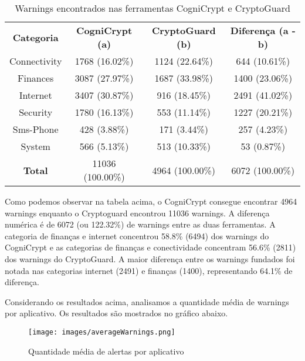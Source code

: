 \begin{table}[!htbp]
  \centering
  \begin{tabular}{|c|c|c|c|}
  
    \textbf{Categoria}   & \textbf{CogniCrypt (a)}   &  \textbf{CryptoGuard (b)}     &  \textbf{Diferença (a - b)} \\ 
     Connectivity           & \num{1768} (\num{16.02}\%)  &  \num{1124} (\num{22.64}\%)  & \num{644} (\num{10.61}\%) \\
Finances                &     \num{3087} (\num{27.97}\%)     &     \num{1687} (\num{33.98}\%)     &     \num{1400} (\num{23.06}\%)\\
Internet                 &     \num{3407} (\num{30.87}\%)     &     \num{916} (\num{18.45}\%)     &     \num{2491} (\num{41.02}\%)\\
Security                 &     \num{1780} (\num{16.13}\%)     &     \num{553} (\num{11.14}\%)     &     \num{1227} (\num{20.21}\%)\\
Sms-Phone            &     \num{428} (\num{3.88}\%)     &     \num{171} (\num{3.44}\%)     &     \num{257} (\num{4.23}\%)\\
System                  &     \num{566} (\num{5.13}\%)     &     \num{513} (\num{10.33}\%)     &     \num{53} (\num{0.87}\%)\\
\textbf{Total}                     &     \num{11036} (\num{100.00}\%)     &     \num{4964} (100.00\%)     &     \num{6072} (\num{100.00}\%)\\
\end{tabular}
    
  \caption{Warnings encontrados nas ferramentas CogniCrypt e CryptoGuard}
\label{AplicativosComWarning}
\end{table}

Como podemos observar na tabela acima, o CogniCrypt consegue encontrar 4964 warnings enquanto o Cryptoguard encontrou 11036 warnings. A diferença numérica é de 6072 (ou 122.32\%) de warnings entre as duas ferramentas. A categoria de finanças e internet concentrou 58.8\% (6494) dos warnings do CogniCrypt e as categorias de finanças e conectividade concentram 56.6\% (2811) dos warnings do CryptoGuard. A maior diferença entre os warnings fundados foi notada nas categorias internet (2491) e finanças (1400), representando 64.1\% de diferença. 

Considerando os resultados acima, analisamos a quantidade média de warnings por aplicativo. Os resultados são mostrados no gráfico abaixo.

\begin{figure}[!h]
    \centering
    \texttt{[image: images/averageWarnings.png]}
    \caption{Quantidade média de alertas por aplicativo}
    \label{averageWarnings}
\end{figure}


